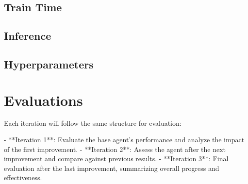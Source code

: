 \documentclass[
12pt, %
oneside, %
english, %
onehalfspacing, %
nolistspacing, %
liststotoc, %
headsepline, %
]{ProposalAndThesis} %
\begin{document}
\section{Train Time}
\section{Inference}

\section{Hyperparameters}

\chapter{Evaluations}

Each iteration will follow the same structure for evaluation:

- **Iteration 1**: Evaluate the base agent's performance and analyze the impact of the first improvement.
- **Iteration 2**: Assess the agent after the next improvement and compare against previous results.
- **Iteration 3**: Final evaluation after the last improvement, summarizing overall progress and effectiveness.
\end{document}
